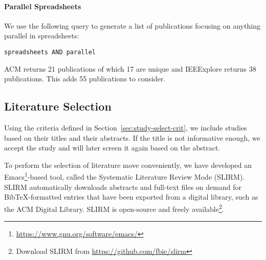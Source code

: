 \documentclass[a4paper]{article}
\begin{document}
\paragraph{Parallel Spreadsheets}

We use the following query to generate a list of publications focusing
on anything parallel in spreadsheets:

\begin{lstlisting}
spreadsheets AND parallel
\end{lstlisting}

\noindent ACM returns 21 publications of which 17 are unique and
IEEExplore returns 38 publications. This adds 55 publications to
consider.

\subsection{Literature Selection}
\label{sec:literature-selection}

Using the criteria defined in Section~\ref{sec:study-select-crit}, we
include studies based on their titles and their abstracts. If the
title is not informative enough, we accept the study and will later
screen it again based on the abstract.

To perform the selection of literature move conveniently, we have
developed an
Emacs\footnote{\url{https://www.gnu.org/software/emacs/}}-based tool,
called the Systematic Literature Review Mode (SLIRM). SLIRM
automatically downloads abstracts and full-text files on demand for
BibTeX-formatted entries that have been exported from a digital
library, such as the ACM Digital Library. SLIRM is open-source and
freely available\footnote{Download SLIRM from
  \url{https://github.com/fbie/slirm}}.
\end{document}

